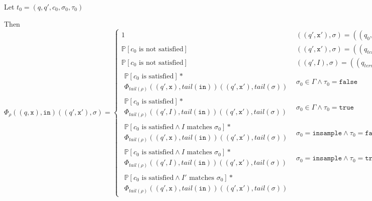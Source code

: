 \documentclass[12pt]{article}
\newcommand{\PP}{\mathbb{P}}
\theoremstyle{definition}
\begin{document}
Let $t_0 = (q, q', c_0, \sigma_0, \tau_0)$

Then \[
    \Phi_{\rho}((q, \texttt{x}), \texttt{in})((q', \texttt{x}'), \sigma) = \begin{cases}
        1 & ((q', \texttt{x}'), \sigma)=((q_0, \texttt{x}), \lambda)\land n = 0\\
        \PP[c_0\text{ is not satisfied}] & ((q', \texttt{x}'), \sigma) = ((q_{term}, \texttt{x}), \lambda)\land \tau_0 = \texttt{false} \\
        \PP[c_0\text{ is not satisfied}] & ((q', I), \sigma) = ((q_{term}, \texttt{x}), \lambda)\land \tau_0 = \texttt{true}\\
        \begin{gathered}
            \PP[c_0\text{ is satisfied}]*\\
            \Phi_{tail(\rho)}((q',\texttt{x}), tail(\texttt{in}))((q', \texttt{x}'), tail(\sigma))
        \end{gathered} & \sigma_0 \in \Gamma\land \tau_0 = \texttt{false}\\[15pt]
        \begin{gathered}
            \PP[c_0\text{ is satisfied}]*\\
            \Phi_{tail(\rho)}((q',I), tail(\texttt{in}))((q', \texttt{x}'), tail(\sigma))
        \end{gathered} & \sigma_0 \in \Gamma\land\tau_0 = \texttt{true}\\[15pt]
        \begin{gathered}
            \PP[c_0\text{ is satisfied}\land I \text{ matches }\sigma_0]*\\
            \Phi_{tail(\rho)}((q',\texttt{x}), tail(\texttt{in}))((q', \texttt{x}'), tail(\sigma))
        \end{gathered} & \sigma_0 = \texttt{insample}\land \tau_0 = \texttt{false}\\[15pt]
        \begin{gathered}
            \PP[c_0\text{ is satisfied}\land I \text{ matches }\sigma_0]*\\
            \Phi_{tail(\rho)}((q',I), tail(\texttt{in}))((q', \texttt{x}'), tail(\sigma))
        \end{gathered} & \sigma_0 = \texttt{insample}\land\tau_0 = \texttt{true}\\[15pt]
        \begin{gathered}
            \PP[c_0\text{ is satisfied}\land I' \text{ matches }\sigma_0]*\\
            \Phi_{tail(\rho)}((q',\texttt{x}), tail(\texttt{in}))((q', \texttt{x}'), tail(\sigma))

\end{gathered}
\end{cases}\]
\end{document}
